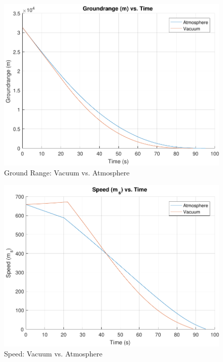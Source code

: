 \begin{figure}[H]
	\centering
	\begin{minipage}{4.5 in}
		\includegraphics[width=\linewidth]{Figures/rngatmovsvac.pdf}
		\caption{Ground Range: Vacuum vs. Atmosphere \label{fig:rngatmovsvac} }
	\end{minipage}
\end{figure}

\begin{figure}[H]
	\centering
	\begin{minipage}{4.5 in}
		\includegraphics[width=\linewidth]{Figures/spdatmovsvac.pdf}
		\caption{Speed: Vacuum vs. Atmosphere \label{fig:spdatmovsvac} }
	\end{minipage}
\end{figure}

